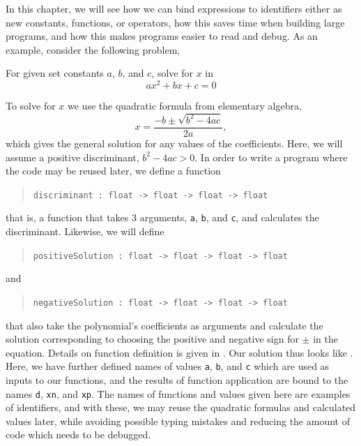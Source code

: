 \documentclass[fsharpNotes.tex]{subfiles}
\begin{document}
In this chapter, we will see how we can bind expressions to identifiers either as new constants, functions, or operators, how this saves time when building large programs, and how this makes programs easier to read and debug. As an example, consider the following problem,
\begin{task}
  For given set constants $a$, $b$, and $c$, solve for $x$ in
  \begin{equation}
  a x^2+bx+c = 0
\end{equation}
\end{task}
To solve for $x$ we use the quadratic formula from elementary algebra,
\begin{equation}
  x = \frac{-b\pm\sqrt{b^2-4ac}}{2a},
\end{equation}
which gives the general solution for any values of the coefficients. Here, we will assume a positive discriminant, $b^2-4ac>0$. In order to write a program where the code may be reused later, we define a function
\begin{quote}
  \lstinline!discriminant : float -> float -> float -> float!
\end{quote}
that is, a function that takes 3 arguments, \lstinline!a!, \lstinline!b!, and \lstinline!c!, and calculates the discriminant. Likewise, we will define
\begin{quote}
  \lstinline!positiveSolution : float -> float -> float -> float!
\end{quote}
and
\begin{quote}
  \lstinline!negativeSolution : float -> float -> float -> float!
\end{quote}
that also take the polynomial's coefficients as arguments and calculate the solution corresponding to choosing the positive and negative sign for $\pm$ in the equation. Details on function definition is given in . Our solution thus looks like .
%
%
Here, we have further defined names of values \lstinline!a!, \lstinline!b!, and \lstinline!c! which are used as inputs to our functions, and the results of function application are bound to the names \lstinline!d!, \lstinline!xn!, and \lstinline!xp!. The names of functions and values given here are examples of identifiers, and with these, we may reuse the quadratic formulas and calculated values later, while avoiding possible typing mistakes and reducing the amount of code which needs to be debugged.
\end{document}
